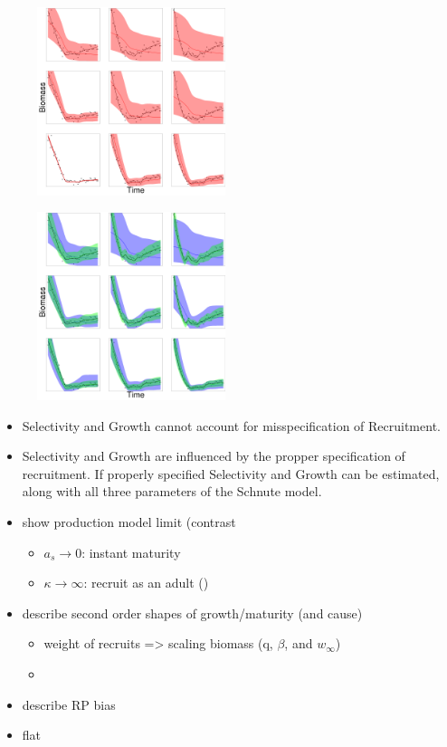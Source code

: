 %
\begin{figure}[h!]
\includegraphics[width=0.49\textwidth]{../ddBias/indexGridExpT45N300A0-1AS10K0.1.png}
\caption{}
\end{figure}

%
\begin{figure}[h!]
\includegraphics[width=0.49\textwidth]{../ddBias/indexGridKAExpT45N300A0-1AS10K0.1.png}
\caption{}
\end{figure}

%
\begin{itemize}
%
\item Selectivity and Growth cannot account for misspecification of Recruitment. 
%
\item Selectivity and Growth are influenced by the propper specification of recruitment. If properly specified Selectivity and Growth can be estimated, along with all three parameters of the Schnute model.
\end{itemize}

%
\begin{itemize}
\item show production model limit (contrast %
\begin{itemize}
	\item $a_s\rightarrow0$: instant maturity
	\item $\kappa\rightarrow\infty$: recruit as an adult ()
\end{itemize}
\item describe second order shapes of growth/maturity (and cause)
\begin{itemize}
	\item weight of recruits => scaling biomass (q, $\beta$, and $w_\infty$)
	\item 
\end{itemize}
\item describe RP bias
\item flat 
\end{itemize}


